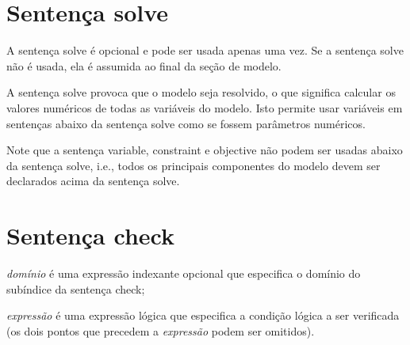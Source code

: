 \documentclass[11pt, brazil]{report}
\begin{document}
\section{Sentença solve}

\noindent
\framebox[468pt][l]{
\parbox[c][24pt]{468pt}{
\hspace{6pt} {\tt solve} {\tt;}
}}

\medskip

A sentença solve é opcional e pode ser usada apenas uma vez.
Se a sentença solve não é usada, ela é assumida ao final da seção de modelo.

A sentença solve provoca que o modelo seja resolvido, o que significa calcular
os valores numéricos de todas as variáveis do modelo. Isto permite usar
variáveis em sentenças abaixo da sentença solve como se fossem parâmetros
numéricos.

Note que a sentença variable, constraint e objective não podem ser usadas
abaixo da sentença solve, i.e., todos os principais componentes do modelo
devem ser declarados acima da sentença solve.


%
%

\newpage

\section{Sentença check}

\noindent
{}

\medskip

\noindent
{\it domínio} é uma expressão indexante opcional que especifica o
domínio do subíndice da sentença check;

\noindent
{\it expressão} é uma expressão lógica que especifica a condição
lógica a ser verificada (os dois pontos que precedem a {\it expressão}
podem ser omitidos).
\end{document}
